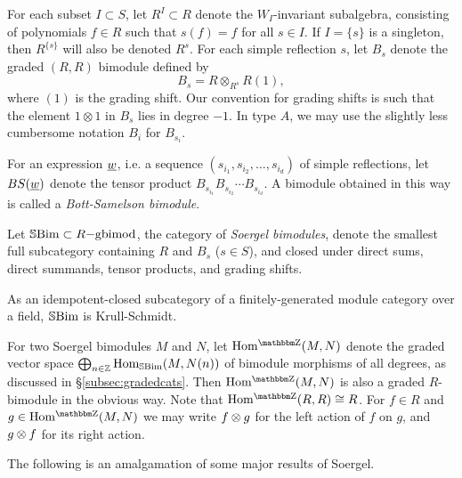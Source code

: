For each subset $I \subset S$, let $R^I\subset R$ denote the $W_I$-invariant subalgebra, consisting of polynomials $f\in R$ such that $s(f)=f$ for all $s\in I$. If $I=\{s\}$ is a
singleton, then $R^{\{s\}}$ will also be denoted $R^s$. For each simple reflection $s$, let $B_s$ denote the graded $(R,R)$ bimodule defined by
\[
B_s = R\otimes_{R^s} R(1),
\]
where $(1)$ is the grading shift.  Our convention for grading shifts is such that the element $1\otimes 1$ in $B_s$ lies in degree $-1$. In type $A$, we may use the slightly less cumbersome notation $B_i$ for $B_{s_i}$.

For an expression $\underline{w}$, i.e. a sequence $(s_{i_1},s_{i_2},\ldots,s_{i_d})$ of simple reflections, let $BS(\underline{w})$ denote the tensor product $B_{s_{i_1}} B_{s_{i_2}} \cdots B_{s_{i_d}}$. A bimodule obtained in this way is called a \emph{Bott-Samelson bimodule}.

\begin{definition}\label{def:SBim_n}
Let ${\mathbb{S}}{\rm Bim }\subset R\mathrm{-gbimod}$, the category of \emph{Soergel bimodules}, denote the smallest full subcategory containing $R$ and $B_s$ ($s\in S$), and closed under direct sums, direct summands, tensor products, and grading shifts.
\end{definition}

As an idempotent-closed subcategory of a finitely-generated module category over a field, ${\mathbb{S}}{\rm Bim }$ is Krull-Schmidt.


For two Soergel bimodules $M$ and $N$, let $\Homg(M,N)$ denote the graded vector space $\bigoplus_{n \in {\mathbb{Z}}} \operatorname{Hom}_{{\mathbb{S}}{\rm Bim }}(M,N(n))$ of bimodule morphisms of all degrees, as discussed in \S \ref{subsec:gradedcats}.  Then $\Homg(M,N)$ is also a graded $R$-bimodule in the obvious way. Note that $\Homg(R,R) \cong R$. For $f \in R$ and $g \in \Homg(M,N)$ we may write $f \otimes g$ for the left action of $f$ on $g$, and $g \otimes f$ for its right action.

The following is an amalgamation of some major results of Soergel.



